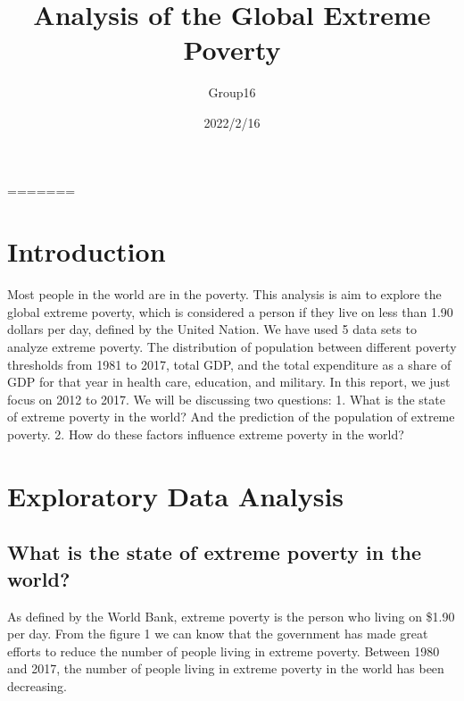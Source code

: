 \documentclass[
]{article}
\title{Analysis of the Global Extreme Poverty}
\author{Group16}
\date{2022/2/16}
\begin{document}
\maketitle

=======

\hypertarget{introduction}{%
\section{Introduction}\label{introduction}}

Most people in the world are in the poverty. This analysis is aim to
explore the global extreme poverty, which is considered a person if they
live on less than 1.90 dollars per day, defined by the United Nation. We
have used 5 data sets to analyze extreme poverty. The distribution of
population between different poverty thresholds from 1981 to 2017, total
GDP, and the total expenditure as a share of GDP for that year in health
care, education, and military. In this report, we just focus on 2012 to
2017. We will be discussing two questions: 1. What is the state of
extreme poverty in the world? And the prediction of the population of
extreme poverty. 2. How do these factors influence extreme poverty in
the world?

\hypertarget{exploratory-data-analysis}{%
\section{Exploratory Data Analysis}\label{exploratory-data-analysis}}

\hypertarget{what-is-the-state-of-extreme-poverty-in-the-world}{%
\subsection{What is the state of extreme poverty in the
world?}\label{what-is-the-state-of-extreme-poverty-in-the-world}}

As defined by the World Bank, extreme poverty is the person who living
on \$1.90 per day. From the figure 1 we can know that the government has
made great efforts to reduce the number of people living in extreme
poverty. Between 1980 and 2017, the number of people living in extreme
poverty in the world has been decreasing.
\end{document}
